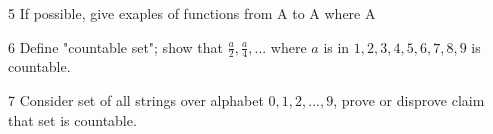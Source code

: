 \documentclass{extarticle}
\newenvironment{problem}[1]{\begin{prob*}{#1}{}}{\end{prob*}}
\begin{document}
\begin{problem}{5}
    If possible, give exaples of functions from A to A where A 
\end{problem}

\begin{problem}{6}
    Define "countable set"; show that ${\frac{a}{2}, \frac{a}{4}, ...}$ where
    $a$ is in ${1, 2, 3, 4, 5, 6, 7, 8, 9}$ is countable.
\end{problem}

\begin{problem}{7}
    Consider set of all strings over alphabet ${0, 1, 2, ..., 9}$, prove or 
    disprove claim that set is countable.
\end{problem}
\end{document}
